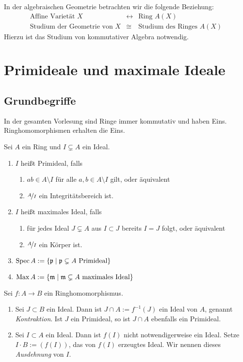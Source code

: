 \documentclass[12pt,a4paper]{scrartcl}
\theoremstyle{cplain}
\theoremstyle{cdef}
\begin{document}
In der algebraischen Geometrie betrachten wir die folgende Beziehung:
\begin{eqnarray*}
    \text{Affine Varietät $X$} & \longleftrightarrow & \text{Ring $A(X)$} \\
    \text{Studium der Geometrie von $X$} & \cong & \text{Studium des Ringes $A(X)$}
\end{eqnarray*}
Hierzu ist das Studium von kommutativer Algebra notwendig.
\newpage

\section{Primideale und maximale Ideale}
\subsection{Grundbegriffe}
\begin{konv}
	In der gesamten Vorlesung sind Ringe immer kommutativ und haben Eins. Ringhomomorphismen erhalten die Eins.
\end{konv}
\begin{defi}
	Sei $A$ ein Ring und $I\subsetneq A$ ein Ideal.
	\begin{enumerate}
        \item $I$ heißt Primideal, falls \begin{enumerate}
            \item $ab \in A \setminus I$ für alle $a,b \in A \setminus I$ gilt, oder äquivalent
            \item $\nicefrac{A}{I}$ ein Integritätsbereich ist.
        \end{enumerate}
        \item $I$ heißt maximales Ideal, falls \begin{enumerate}
            \item für jedes Ideal $J \subsetneq A$ aus $I \subset J$ bereits $I=J$ folgt, oder äquivalent
            \item $\nicefrac{A}{I}$ ein Körper ist.
        \end{enumerate}
		\item $\operatorname{Spec} A := \{\mathfrak{p} \mid \mathfrak{p} \subsetneq A \text{ Primideal}\}$
		\item $\operatorname{Max} A:=\{\mathfrak{m} \mid \mathfrak{m} \subsetneq A \text{ maximales Ideal}\}$
	\end{enumerate}
\end{defi}
\begin{defi} Sei $f: A \to B$ ein Ringhomomorphismus.
	\begin{enumerate}
		\item Sei $J \subset B$ ein Ideal. Dann ist $J \cap A:=f^{-1}(J)$ ein Ideal von $A$, genannt \emph{Kontraktion}. Ist $J$ ein Primideal, so ist $J \cap A$ ebenfalls ein Primideal.
		\item Sei $I \subset A$ ein Ideal. Dann ist $f(I)$ nicht notwendigerweise ein Ideal. Setze $I \cdot B := \left( f(I) \right)$, das von $f(I)$ erzeugtes Ideal. Wir nennen dieses \emph{Ausdehnung} von $I$.
	\end{enumerate}
\end{defi}
\end{document}
